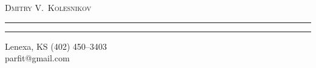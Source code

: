 \pagestyle{fancy}
\renewcommand{\headrulewidth}{0pt}
\setlength{\parindent}{0in}

\begin{center}
\begin{LARGE}
\textsc{Dmitry V.\ Kolesnikov}
\end{LARGE}
\end{center}
\vspace{-0.5mm}
\hrule
\vspace{0.3mm}
\hrule
\vspace{3mm}
\begin{small}\textnormal{Lenexa, KS} \hfill \textnormal{\Telefon\hspace{1mm}(402) 450--3403}\\ %
\null \hfill \textnormal{\Letter\hspace{0.8mm}parfit@gmail.com}\\\end{small}
\vspace{2mm}